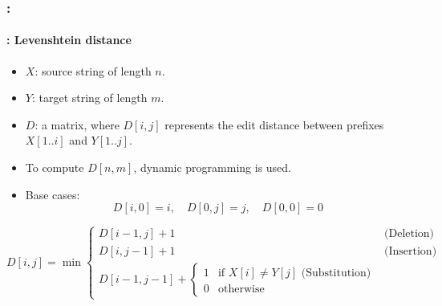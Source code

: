 \documentclass[xcolor=table]{beamer}
\begin{document}
\begin{frame}
	\frametitle{\insertshortsubtitle: \insertsection}
	\framesubtitle{\insertsubsection: Levenshtein distance}
	
	\begin{itemize}
		\item $X$: source string of length $n$.
		\item $Y$: target string of length $m$.
		\item $D$: a matrix, where $D[i, j]$ represents the edit distance between prefixes $X[1..i]$ and $Y[1..j]$.
		\item To compute $D[n, m]$, dynamic programming is used.
		\item Base cases:
		\[
		D[i,0] = i, \quad D[0,j] = j, \quad D[0,0] = 0
		\]
	\end{itemize}
	
	\[
	D[i, j] = \min 
	\begin{cases}
		D[i - 1, j] + 1 & \text{(Deletion)}\\
		D[i, j-1] + 1 & \text{(Insertion)}\\
		D[i-1, j-1] + 
		\begin{cases}
			1 & \text{if } X[i] \ne Y[j] \text{ (Substitution)}\\
			0 & \text{otherwise}
		\end{cases}
	\end{cases}
	\]
	
\end{frame}
\end{document}
